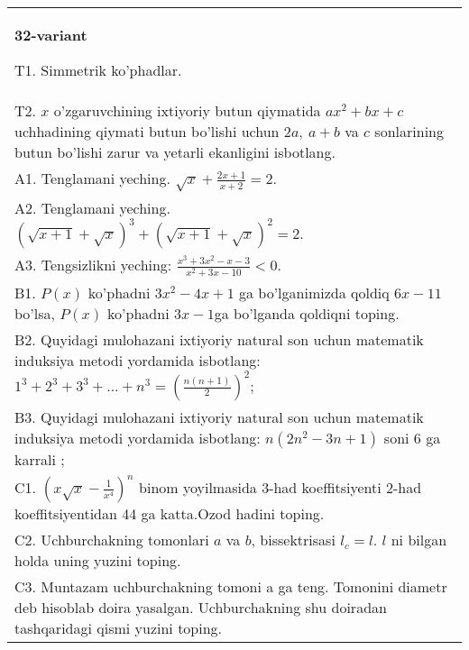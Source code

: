 \documentclass{article}
\begin{document}
\begin{tabular}{m{17cm}}
\textbf{32-variant}
\newline

T1. Simmetrik ko'phadlar. \\
T2. \(x\) o'zgaruvchining ixtiyoriy butun qiymatida \(ax^{2} + bx + c\) uchhadining qiymati butun bo'lishi uchun \(2a,\ a + b\) va \(c\) sonlarining butun bo'lishi zarur va yetarli ekanligini isbotlang. \\
A1. Tenglamani yeching. \(\sqrt{x} + \frac{2x + 1}{x + 2} = 2\). \\
A2. Tenglamani yeching. \((\sqrt{x + 1} + \sqrt{x})^{3} + (\sqrt{x + 1} + \sqrt{x})^{2} = 2\). \\
A3. Tengsizlikni yeching: \(\frac{x^{3} + 3x^{2} - x - 3}{x^{2} + 3x - 10} < 0\). \\
B1. \(P(x)\) ko'phadni \(3x^{2} - 4x + 1\) ga bo'lganimizda qoldiq \(6x - 11\) bo'lsa, \(P(x)\) ko'phadni \(3x - 1\)ga bo'lganda qoldiqni toping. \\
B2. Quyidagi mulohazani ixtiyoriy natural son uchun matematik induksiya metodi yordamida isbotlang: \(1^{3} + 2^{3} + 3^{3} + ... + n^{3} = \left( \frac{n(n + 1)}{2} \right)^{2}\); \\
B3. Quyidagi mulohazani ixtiyoriy natural son uchun matematik induksiya metodi yordamida isbotlang: \(n\left( 2n^{2} - 3n + 1 \right)\) soni 6 ga karrali ; \\
C1. \(\left( x\sqrt{x} - \frac{1}{x^{4}} \right)^{n}\) binom yoyilmasida 3-had koeffitsiyenti 2-had koeffitsiyentidan 44 ga katta.Ozod hadini toping. \\
C2. Uchburchakning tomonlari \(a\) va \(b\), bissektrisasi \(l_{c} = l\). \(l\) ni bilgan holda uning yuzini toping. \\
C3. Muntazam uchburchakning tomoni a ga teng. Tomonini diametr deb hisoblab doira yasalgan. Uchburchakning shu doiradan tashqaridagi qismi yuzini toping. \\

\end{tabular}
\vspace{1cm}
\end{document}
